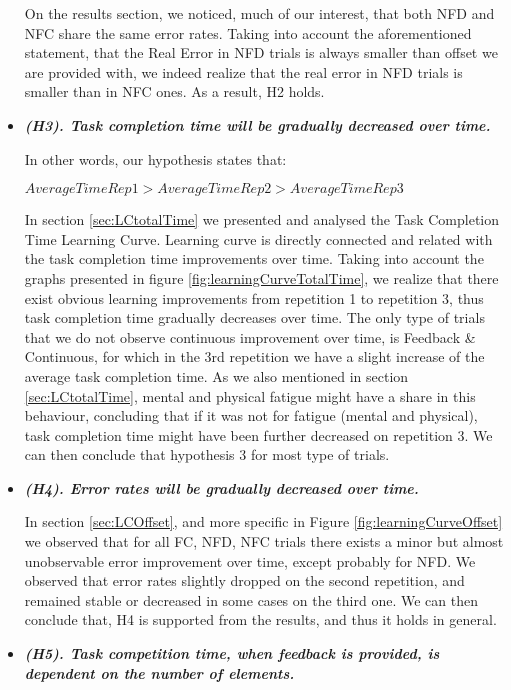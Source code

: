 \begin{itemize}
    On the results section, we noticed, much of our interest, that both NFD and NFC share the same error rates. Taking into account the aforementioned statement, that the Real Error in NFD trials is always smaller than offset we are provided with, we indeed realize that the real error in NFD trials is smaller than in NFC ones. As a result, H2 holds.

    \item \textbf{\textit{(H3). Task completion time will be gradually decreased over time.}}

    In other words, our hypothesis states that: 

    $AverageTimeRep1 > AverageTimeRep2 > AverageTimeRep3$ 

    In section \ref{sec:LCtotalTime} we presented and analysed the Task Completion Time Learning Curve. Learning curve is directly connected and related with the task completion time improvements over time. Taking into account the graphs presented in figure \ref{fig:learningCurveTotalTime}, we realize that there exist obvious learning improvements from repetition 1 to repetition 3, thus task completion time gradually decreases over time.  The only type of trials that we do not observe continuous improvement over time, is Feedback \& Continuous, for which in the 3rd repetition we have a slight increase of the average task completion time. As we also mentioned in section \ref{sec:LCtotalTime}, mental and physical fatigue might have a share in this behaviour, concluding that if it was not for fatigue (mental and physical), task completion time might have been further decreased on repetition 3. We can then conclude that hypothesis 3 for most type of trials.

    \item \textbf{\textit{(H4). Error rates will be gradually decreased over time.}}
    
    In section \ref{sec:LCOffset}, and more specific in Figure \ref{fig:learningCurveOffset} we observed that for all FC, NFD, NFC trials there exists a minor but almost unobservable error improvement over time, except probably for NFD. We observed that error rates slightly dropped on the second repetition, and remained stable or decreased in some cases on the third one. We can then conclude that, H4 is supported from the results, and thus it holds in general. 


    \item \textbf{\textit{(H5). Task competition time, when feedback is provided, is dependent on the number of elements.}}


\end{itemize}
